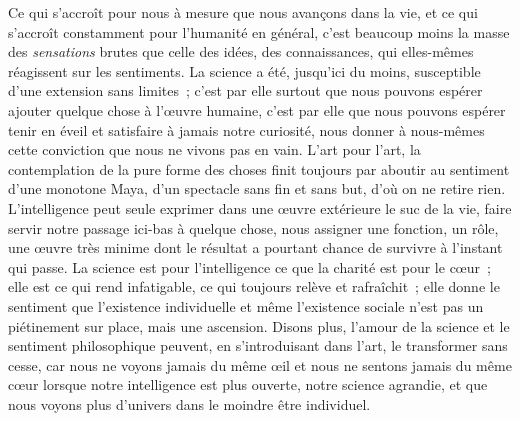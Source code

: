 \documentclass[french,twoside]{book} %
\begin{document}
Ce qui s’accroît pour nous à mesure que nous avançons dans la vie, et ce qui s’accroît constamment pour l’humanité en général, c’est beaucoup moins la masse des \emph{sensations} brutes que celle des idées, des connaissances, qui elles-mêmes réagissent sur les sentiments. La science a été, jusqu’ici du moins, susceptible d’une extension sans limites ; c’est par elle surtout que nous pouvons espérer ajouter quelque chose à l’œuvre humaine, c’est par elle que nous pouvons espérer tenir en éveil et satisfaire à jamais notre curiosité, nous donner à nous-mêmes cette conviction que nous ne vivons pas en vain. L’art pour l’art, la contemplation de la pure forme des choses finit toujours par aboutir au sentiment d’une monotone Maya, d’un spectacle sans fin et sans but, d’où on ne retire rien. L’intelligence peut seule exprimer dans une œuvre extérieure le suc de la vie, faire servir notre passage ici-bas à quelque chose, nous assigner une fonction, un rôle, une œuvre très minime dont le résultat a pourtant chance de survivre à l’instant qui passe. La science est pour l’intelligence ce que la charité est pour le cœur ; elle est ce qui rend infatigable, ce qui toujours relève et rafraîchit ; elle donne le sentiment que l’existence individuelle et même l’existence sociale n’est pas un piétinement sur place, mais une ascension. Disons plus, l’amour de la science et le sentiment philosophique peuvent, en s’introduisant dans l’art, le transformer sans cesse, car nous ne voyons jamais du même œil et nous ne sentons jamais du même cœur lorsque notre intelligence est plus ouverte, notre science agrandie, et que nous voyons plus d’univers dans le moindre être individuel.\par
\end{document}

